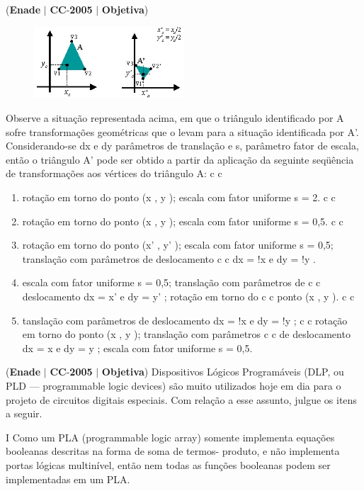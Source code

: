\documentclass{exam}
\begin{document}
\begin{questions}
\question (\textbf{Enade} $|$ \textbf{CC}-\textbf{2005} $|$ \textbf{Objetiva})

\begin{figure}[H]
	\begin{center}
		\includegraphics[width=0.5\textwidth]{CIENCIA_DA_COMPUTACAO_Prova2005-utf8_figuras/fig-0041.jpg}
	\end{center}
\end{figure}
Observe a situação representada acima, em que o triângulo
identificado por A sofre transformações geométricas que o levam para
a situação identificada por A’. Considerando-se dx e dy parâmetros
de translação e s, parâmetro fator de escala, então o triângulo A’ pode
ser obtido a partir da aplicação da seguinte seqüência de
transformações aos vértices do triângulo A:
c c
	\begin{enumerate}[label=\alph*)]
		\item  rotação em torno do ponto (x , y ); escala com fator uniforme
s = 2.
c c
		\item  rotação em torno do ponto (x , y ); escala com fator uniforme
s = 0,5.
c c
		\item  rotação em torno do ponto (x' , y' ); escala com fator
uniforme s = 0,5; translação com parâmetros de deslocamento
c c
dx = !x e dy = !y .
		\item  escala com fator uniforme s = 0,5; translação com parâmetros de
c c
deslocamento dx = x' e dy = y' ; rotação em torno do
c c
ponto (x , y ).
c c
		\item  tanslação com parâmetros de deslocamento dx = !x e dy = !y ;
c c
rotação em torno do ponto (x , y ); translação com parâmetros
c c
de deslocamento dx = x e dy = y ; escala com fator uniforme
s = 0,5.
	\end{enumerate}

\question (\textbf{Enade} $|$ \textbf{CC}-\textbf{2005} $|$ \textbf{Objetiva})
Dispositivos Lógicos Programáveis (DLP, ou PLD — programmable
logic devices) são muito utilizados hoje em dia para o projeto de
circuitos digitais especiais. Com relação a esse assunto, julgue os
itens a seguir.

I Como um PLA (programmable logic array) somente implementa
equações booleanas descritas na forma de soma de termos-
produto, e não implementa portas lógicas multinível, então nem
todas as funções booleanas podem ser implementadas em um
PLA.


\end{questions}
\end{document}
